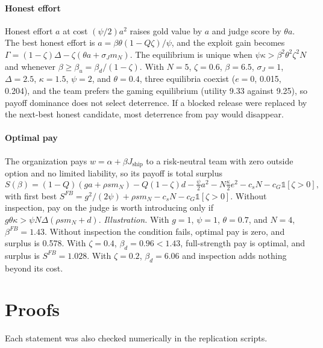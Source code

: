 \documentclass[acmsmall,screen,review,anonymous]{acmart}
\theoremstyle{acmdefinition}
\begin{document}
\paragraph{Honest effort} Honest effort $a$ at cost $(\psi/2)a^2$ raises gold value by $a$ and judge score by $\theta a$. The best honest effort is $a = \beta\theta(1 - Q\zeta)/\psi$, and the exploit gain becomes $\Gamma = (1-\zeta)\Delta - \zeta(\theta a + \sigma_J m_N)$. The equilibrium is unique when $\psi\kappa > \beta^2\theta^2\zeta^2 N$ and whenever $\beta \ge \beta_u = \beta_d/(1-\zeta)$. With $N = 5$, $\zeta = 0.6$, $\beta = 6.5$, $\sigma_J = 1$, $\Delta = 2.5$, $\kappa = 1.5$, $\psi = 2$, and $\theta = 0.4$, three equilibria coexist ($e = 0$, 0.015, 0.204), and the team prefers the gaming equilibrium (utility 9.33 against 9.25), so payoff dominance does not select deterrence. If a blocked release were replaced by the next-best honest candidate, most deterrence from pay would disappear.

\paragraph{Optimal pay} The organization pays $w = \alpha + \beta J_{\text{ship}}$ to a risk-neutral team with zero outside option and no limited liability, so its payoff is total surplus
\begin{equation}
S(\beta) = (1-Q)(ga + \rho s m_N) - Q(1-\zeta)d - \tfrac{\psi}{2}a^2 - N\tfrac{\kappa}{2}e^2 - c_s N - c_G\mathbb{1}[\zeta>0], \tag{B.1}
\end{equation}
with first best $S^{FB} = g^2/(2\psi) + \rho s m_N - c_s N - c_G\mathbb{1}[\zeta>0]$. Without inspection, pay on the judge is worth introducing only if $g\theta\kappa > \psi N\Delta(\rho s m_N + d)$. \emph{Illustration.} With $g = 1$, $\psi = 1$, $\theta = 0.7$, and $N = 4$, $\beta^{FB} = 1.43$. Without inspection the condition fails, optimal pay is zero, and surplus is 0.578. With $\zeta = 0.4$, $\beta_d = 0.96 < 1.43$, full-strength pay is optimal, and surplus is $S^{FB} = 1.028$. With $\zeta = 0.2$, $\beta_d = 6.06$ and inspection adds nothing beyond its cost.

\section{Proofs}\label{app:proofs}

Each statement was also checked numerically in the replication scripts.
\end{document}
